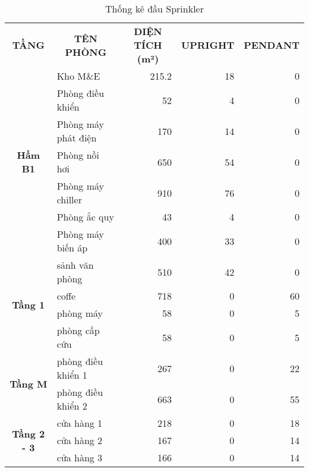 \begin{table}[H]
	\centering
	\caption{Thống kê đầu Sprinkler}
	\begin{tabular}{|c|l|r|r|r|}
		\hline
		\multirow{2}[2]{*}{\textbf{ TẦNG}} & \multicolumn{1}{c|}{\multirow{2}[2]{*}{\textbf{TÊN PHÒNG}}} & \multicolumn{1}{c|}{\multirow{2}[2]{*}{\textbf{DIỆN TÍCH (m²) }}} & \multicolumn{1}{c|}{\multirow{2}[2]{*}{\textbf{UPRIGHT}}} & \multicolumn{1}{c|}{\multirow{2}[2]{*}{\textbf{PENDANT}}} \bigstrut[t]\\
		&          &          &          &  \bigstrut[b]\\
		\hline
		\multirow{7}[14]{*}{\textbf{Hầm B1}} & Kho M\&E & 215.2    & 18       & 0 \bigstrut\\
		\cline{2-5}             & Phòng điều khiển & 52       & 4        & 0 \bigstrut\\
		\cline{2-5}             & Phòng máy phát điện & 170      & 14       & 0 \bigstrut\\
		\cline{2-5}             & Phòng nồi hơi & 650      & 54       & 0 \bigstrut\\
		\cline{2-5}             & Phòng máy chiller & 910      & 76       & 0 \bigstrut\\
		\cline{2-5}             & Phòng ắc quy & 43       & 4        & 0 \bigstrut\\
		\cline{2-5}             & Phòng máy biến áp & 400      & 33       & 0 \bigstrut\\
		\hline
		\multirow{4}[8]{*}{\textbf{Tầng 1}} & sảnh văn phòng & 510      & 42       & 0 \bigstrut\\
		\cline{2-5}             & coffe    & 718      & 0        & 60 \bigstrut\\
		\cline{2-5}             & phòng máy & 58       & 0        & 5 \bigstrut\\
		\cline{2-5}             & phòng cấp cứu & 58       & 0        & 5 \bigstrut\\
		\hline
		\multirow{2}[4]{*}{\textbf{Tầng M}} & phòng điều khiển 1 & 267      & 0        & 22 \bigstrut\\
		\cline{2-5}             & phòng điều khiển 2 & 663      & 0        & 55 \bigstrut\\
		\hline
		\multirow{6}[12]{*}{\textbf{Tầng 2 - 3}} & cửa hàng 1 & 218      & 0        & 18 \bigstrut\\
		\cline{2-5}             & cửa hàng 2 & 167      & 0        & 14 \bigstrut\\
		\cline{2-5}             & cửa hàng 3 & 166      & 0        & 14 \bigstrut\\

\end{tabular}
\end{table}
